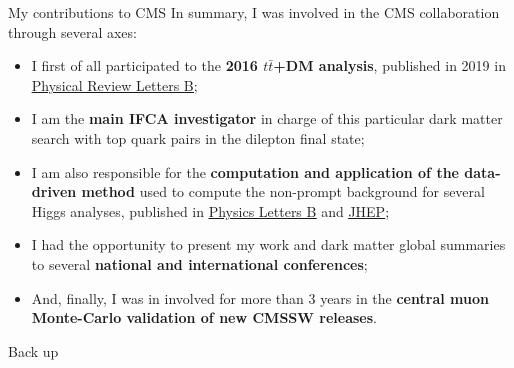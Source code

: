 \documentclass[8pt]{beamer}
\newcommand{\backupbegin}{
   \newcounter{finalframe}
   \setcounter{finalframe}{\value{framenumber}}
}
\begin{document}
\begin{frame}{My contributions to CMS}
\justifying
In summary, \alert{I was involved in the CMS collaboration} through several axes:
\begin{itemize}
\justifying
\item I first of all participated to the \textbf{2016 $t \bar t$+DM analysis}, published in 2019 in \href{https://journals.aps.org/prl/abstract/10.1103/PhysRevLett.122.011803}{\underline{Physical Review Letters B}};
\item I am the \textbf{main IFCA investigator} in charge of this particular dark matter search with top quark pairs in the dilepton final state;
\item I am also responsible for the \textbf{computation and application of the data-driven method} used to compute the non-prompt background for several Higgs analyses, published in \href{https://research.monash.edu/en/publications/measurements-of-properties-of-the-higgs-boson-decaying-to-a-w-bos}{\underline{Physics Letters B}} and \href{https://arxiv.org/abs/2007.01984}{\underline{JHEP}};
\item I had the opportunity to present my work and dark matter global summaries to several \textbf{national and international conferences};
\item And, finally, I was in involved for more than 3 years in the \textbf{central muon Monte-Carlo validation of new CMSSW releases}.
\end{itemize}
\end{frame}
























\backupbegin

\begin{frame}[standout]
Back up
\end{frame}
\end{document}
